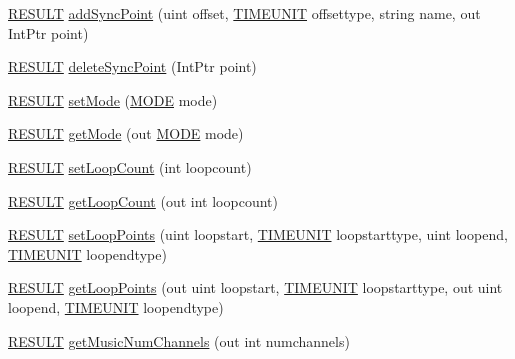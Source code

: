 \begin{DoxyCompactItemize}
\item 
\hyperlink{namespace_f_m_o_d_a305d1176ef3f8c8815861a60407ac33d}{R\+E\+S\+U\+LT} \hyperlink{class_f_m_o_d_1_1_sound_a9ace9587bd4654227f74c9d80cc16473}{add\+Sync\+Point} (uint offset, \hyperlink{namespace_f_m_o_d_aff20975332f93ff2180d2681cb43929f}{T\+I\+M\+E\+U\+N\+IT} offsettype, string name, out Int\+Ptr point)
\item 
\hyperlink{namespace_f_m_o_d_a305d1176ef3f8c8815861a60407ac33d}{R\+E\+S\+U\+LT} \hyperlink{class_f_m_o_d_1_1_sound_a9fe7245070dc8b3c4b4ff9961d92a0b9}{delete\+Sync\+Point} (Int\+Ptr point)
\item 
\hyperlink{namespace_f_m_o_d_a305d1176ef3f8c8815861a60407ac33d}{R\+E\+S\+U\+LT} \hyperlink{class_f_m_o_d_1_1_sound_a21c5e81309ef0cc5e0ce8410a680fcc3}{set\+Mode} (\hyperlink{namespace_f_m_o_d_a94ab158a8314f5f4248f1aea55dbefa3}{M\+O\+DE} mode)
\item 
\hyperlink{namespace_f_m_o_d_a305d1176ef3f8c8815861a60407ac33d}{R\+E\+S\+U\+LT} \hyperlink{class_f_m_o_d_1_1_sound_ae8960b4893c57a1cdc897544d3dbc1ca}{get\+Mode} (out \hyperlink{namespace_f_m_o_d_a94ab158a8314f5f4248f1aea55dbefa3}{M\+O\+DE} mode)
\item 
\hyperlink{namespace_f_m_o_d_a305d1176ef3f8c8815861a60407ac33d}{R\+E\+S\+U\+LT} \hyperlink{class_f_m_o_d_1_1_sound_a8cd754abc2f3288bf9a8af077e36b0af}{set\+Loop\+Count} (int loopcount)
\item 
\hyperlink{namespace_f_m_o_d_a305d1176ef3f8c8815861a60407ac33d}{R\+E\+S\+U\+LT} \hyperlink{class_f_m_o_d_1_1_sound_aef41e2f4f4c2d0821786f26a477d2428}{get\+Loop\+Count} (out int loopcount)
\item 
\hyperlink{namespace_f_m_o_d_a305d1176ef3f8c8815861a60407ac33d}{R\+E\+S\+U\+LT} \hyperlink{class_f_m_o_d_1_1_sound_a86a63f41cba14bdac8de37909ea5024f}{set\+Loop\+Points} (uint loopstart, \hyperlink{namespace_f_m_o_d_aff20975332f93ff2180d2681cb43929f}{T\+I\+M\+E\+U\+N\+IT} loopstarttype, uint loopend, \hyperlink{namespace_f_m_o_d_aff20975332f93ff2180d2681cb43929f}{T\+I\+M\+E\+U\+N\+IT} loopendtype)
\item 
\hyperlink{namespace_f_m_o_d_a305d1176ef3f8c8815861a60407ac33d}{R\+E\+S\+U\+LT} \hyperlink{class_f_m_o_d_1_1_sound_a76dcdfc403e81c47fdf9ba2e8fd9aa5d}{get\+Loop\+Points} (out uint loopstart, \hyperlink{namespace_f_m_o_d_aff20975332f93ff2180d2681cb43929f}{T\+I\+M\+E\+U\+N\+IT} loopstarttype, out uint loopend, \hyperlink{namespace_f_m_o_d_aff20975332f93ff2180d2681cb43929f}{T\+I\+M\+E\+U\+N\+IT} loopendtype)
\item 
\hyperlink{namespace_f_m_o_d_a305d1176ef3f8c8815861a60407ac33d}{R\+E\+S\+U\+LT} \hyperlink{class_f_m_o_d_1_1_sound_a04c89002c6cdd81c5a72f8f568b5ad91}{get\+Music\+Num\+Channels} (out int numchannels)

\end{DoxyCompactItemize}
